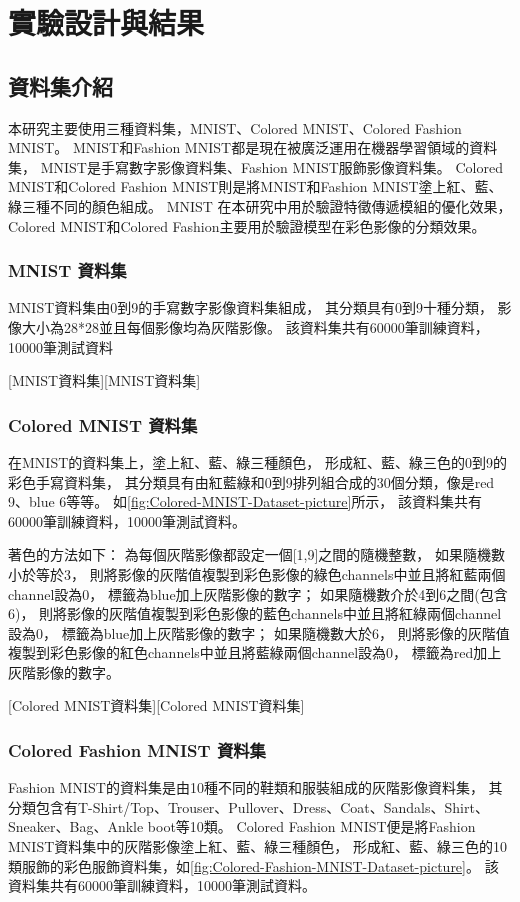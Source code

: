 \documentclass[class=NCU\_thesis, crop=false]{standalone}
\begin{document}
\chapter{實驗設計與結果}
\section{資料集介紹}
本研究主要使用三種資料集，MNIST、Colored MNIST、Colored Fashion MNIST。
MNIST和Fashion MNIST都是現在被廣泛運用在機器學習領域的資料集，
MNIST是手寫數字影像資料集、Fashion MNIST服飾影像資料集。 
Colored MNIST和Colored Fashion MNIST則是將MNIST和Fashion MNIST塗上紅、藍、綠三種不同的顏色組成。
MNIST 在本研究中用於驗證特徵傳遞模組的優化效果，
Colored MNIST和Colored Fashion主要用於驗證模型在彩色影像的分類效果。
\pagebreak
    \subsection{MNIST 資料集}
    MNIST資料集由0到9的手寫數字影像資料集組成，
    其分類具有0到9十種分類，
    影像大小為28*28並且每個影像均為灰階影像。
    該資料集共有60000筆訓練資料，10000筆測試資料

    [MNIST資料集][MNIST資料集]
    \pagebreak
    \subsection{Colored MNIST 資料集}
    在MNIST的資料集上，塗上紅、藍、綠三種顏色，
    形成紅、藍、綠三色的0到9的彩色手寫資料集，
    其分類具有由紅藍綠和0到9排列組合成的30個分類，像是red 9、blue 6等等。
    如\cref{fig:Colored-MNIST-Dataset-picture}所示，
    該資料集共有60000筆訓練資料，10000筆測試資料。

    著色的方法如下：
    為每個灰階影像都設定一個[1,9]之間的隨機整數，
    如果隨機數小於等於3，
    則將影像的灰階值複製到彩色影像的綠色channels中並且將紅藍兩個channel設為0，
    標籤為blue加上灰階影像的數字；
    如果隨機數介於4到6之間(包含6)，
    則將影像的灰階值複製到彩色影像的藍色channels中並且將紅綠兩個channel設為0，
    標籤為blue加上灰階影像的數字；
    如果隨機數大於6，
    則將影像的灰階值複製到彩色影像的紅色channels中並且將藍綠兩個channel設為0，
    標籤為red加上灰階影像的數字。

    [Colored MNIST資料集][Colored MNIST資料集]
    \pagebreak
    \subsection{Colored Fashion MNIST 資料集}
    Fashion MNIST的資料集是由10種不同的鞋類和服裝組成的灰階影像資料集，
    其分類包含有T-Shirt/Top、Trouser、Pullover、Dress、Coat、Sandals、Shirt、Sneaker、Bag、Ankle boot等10類。
    Colored Fashion MNIST便是將Fashion MNIST資料集中的灰階影像塗上紅、藍、綠三種顏色，
    形成紅、藍、綠三色的10類服飾的彩色服飾資料集，如\cref{fig:Colored-Fashion-MNIST-Dataset-picture}。
    該資料集共有60000筆訓練資料，10000筆測試資料。
\end{document}
